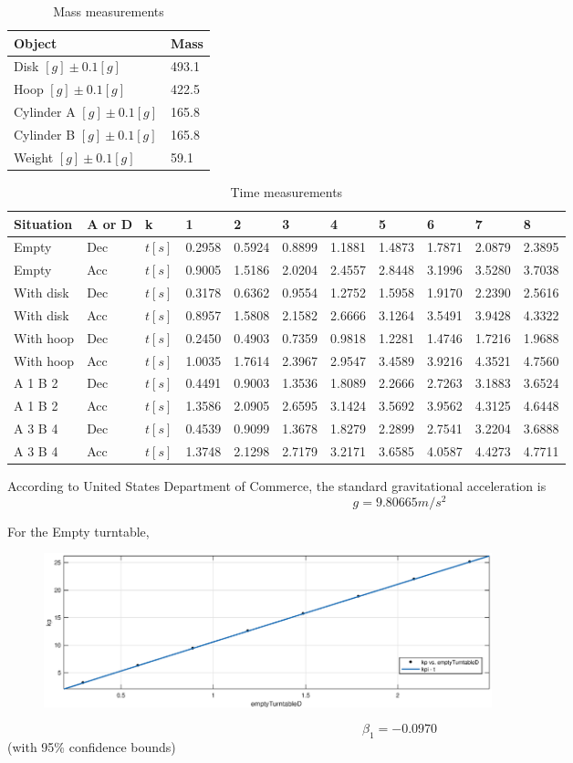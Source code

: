 \begin{table}[H]
  \centering
  \begin{tabularx}{\textwidth}{|X|X|}
    \hline
    Object & Mass\\
	\hline
    Disk $[g] \pm 0.1 [g] $ & 493.1\\
    Hoop $[g] \pm 0.1 [g] $ & 422.5\\
    Cylinder A $[g] \pm 0.1 [g] $ & 165.8\\
    Cylinder B $[g] \pm 0.1 [g] $ & 165.8\\
    Weight $[g] \pm 0.1 [g] $ & 59.1 \\
    \hline
  \end{tabularx}
  \caption{Mass measurements}
  \end{table}
\begin{table}[H]
  \centering
\begin{tabular}{|p{2cm}|p{1.5cm}|l|l|l|l|l|l|l|l|l|}
\hline
Situation & A or D & k & 1 & 2 & 3 & 4 & 5 & 6 & 7 & 8 \\
\hline
Empty & Dec & $t[s]$ & 0.2958 & 0.5924 & 0.8899 & 1.1881 & 1.4873 & 1.7871 & 2.0879 & 2.3895 \\
Empty & Acc & $t[s]$ & 0.9005 & 1.5186 & 2.0204 & 2.4557 & 2.8448 & 3.1996 & 3.5280 & 3.7038 \\
With disk & Dec &  $t[s]$ & 0.3178 & 0.6362 & 0.9554 & 1.2752 & 1.5958 & 1.9170 & 2.2390 & 2.5616 \\
With disk & Acc &  $t[s]$ & 0.8957 & 1.5808 & 2.1582 & 2.6666 & 3.1264 & 3.5491 & 3.9428 & 4.3322 \\
With hoop & Dec &  $t[s]$ & 0.2450 & 0.4903 & 0.7359 & 0.9818 & 1.2281 & 1.4746 & 1.7216 & 1.9688 \\
With hoop & Acc &  $t[s]$ & 1.0035 & 1.7614 & 2.3967 & 2.9547 & 3.4589 & 3.9216 & 4.3521 & 4.7560 \\
A 1 B 2 & Dec &  $t[s]$ & 0.4491 & 0.9003 & 1.3536 & 1.8089 & 2.2666 & 2.7263 & 3.1883 & 3.6524 \\
A 1 B 2 & Acc &  $t[s]$ & 1.3586 & 2.0905 & 2.6595 & 3.1424 & 3.5692 & 3.9562 & 4.3125 & 4.6448 \\
A 3 B 4 & Dec &  $t[s]$ & 0.4539 & 0.9099 & 1.3678 & 1.8279 & 2.2899 & 2.7541 & 3.2204 & 3.6888 \\
A 3 B 4 & Acc &  $t[s]$ & 1.3748 & 2.1298 & 2.7179 & 3.2171 & 3.6585 & 4.0587 & 4.4273 & 4.7711 \\
\hline
\end{tabular}
\caption{ Time measurements}
\end{table}

According to  United States Department of Commerce, the standard gravitational
acceleration is 
$$ g =  9.80665 m/s^2 $$


For the Empty turntable,

\begin{figure}[H]
\centering
\includegraphics[width=13cm]{matlab/etd}
\end{figure}

$$ \beta_1 = -0.0970$$ (with 95\% confidence bounds) 




